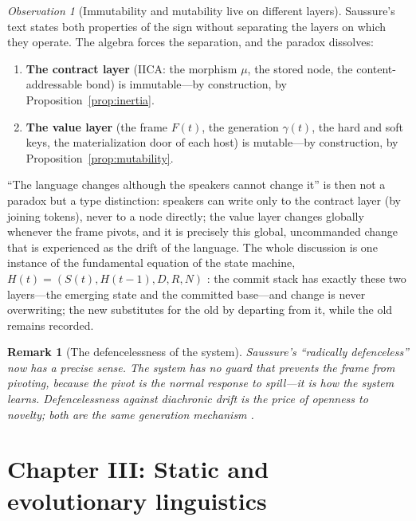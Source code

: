 \documentclass[11pt,a4paper]{article}
\newtheorem{remark}[principle]{Remark}
\theoremstyle{remark}
\newtheorem{observation}[principle]{Observation}
\newcommand{\Ing}{\ensuremath{\mu}}                      %
\newcommand{\Gen}{\ensuremath{\gamma}}                   %
\begin{document}
\begin{observation}[Immutability and mutability live on different layers]
\label{obs:two-layers}
Saussure's text states both properties of the sign without separating the
layers on which they operate. The algebra forces the separation, and the
paradox dissolves:
\begin{enumerate}[leftmargin=*,nosep]
  \item \textbf{The contract layer} (IICA: the morphism $\Ing$, the stored
    node, the content-addressable bond) is immutable---by construction, by
    Proposition~\ref{prop:inertia}.
  \item \textbf{The value layer} (the frame $F(t)$, the generation $\Gen(t)$,
    the hard and soft keys, the materialization door of each host) is
    mutable---by construction, by Proposition~\ref{prop:mutability}.
\end{enumerate}
``The language changes although the speakers cannot change it'' is then not a
paradox but a type distinction: speakers can write only to the contract layer
(by joining tokens), never to a node directly; the value layer changes globally
whenever the frame pivots, and it is precisely this global, uncommanded change
that is experienced as the drift of the language. The whole discussion is one
instance of the fundamental equation of the state machine,
$H(t) = (S(t), H(t{-}1), D, R, N)$ \cite{state2026}: the commit stack has
exactly these two layers---the emerging state and the committed base---and
change is never overwriting; the new substitutes for the old by departing
from it, while the old remains recorded.
\end{observation}

\begin{remark}[The defencelessness of the system]
Saussure's ``radically defenceless'' now has a precise sense. The system has
no guard that prevents the frame from pivoting, because the pivot is the
normal response to spill---it is how the system learns. Defencelessness against
diachronic drift is the price of openness to novelty; both are the same
generation mechanism \cite{state2026}.
\end{remark}

\section{Chapter III: Static and evolutionary linguistics}
\label{sec:ch3}
\end{document}
